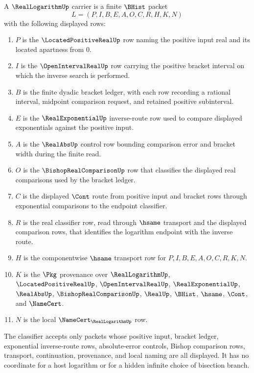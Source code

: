 \begin{definition}
\label{def:real-logarithm-carrier}
A $\RealLogarithmUp$ carrier is a finite $\BHist$ packet
$$
L=(P,I,B,E,A,O,C,R,H,K,N)
$$
with the following displayed rows:
\begin{enumerate}
\item $P$ is the $\LocatedPositiveRealUp$ row naming the positive input real and its located apartness from $0$.
\item $I$ is the $\OpenIntervalRealUp$ row carrying the positive bracket interval on which the inverse search is performed.
\item $B$ is the finite dyadic bracket ledger, with each row recording a rational interval, midpoint comparison request, and retained positive subinterval.
\item $E$ is the $\RealExponentialUp$ inverse-route row used to compare displayed exponentials against the positive input.
\item $A$ is the $\RealAbsUp$ control row bounding comparison error and bracket width during the finite read.
\item $O$ is the $\BishopRealComparisonUp$ row that classifies the displayed real comparisons used by the bracket ledger.
\item $C$ is the displayed $\Cont$ route from positive input and bracket rows through exponential comparisons to the endpoint classifier.
\item $R$ is the real classifier row, read through $\hsame$ transport and the displayed comparison rows, that identifies the logarithm endpoint with the inverse route.
\item $H$ is the componentwise $\hsame$ transport row for $P,I,B,E,A,O,C,R,K,N$.
\item $K$ is the $\Pkg$ provenance over $\RealLogarithmUp$, $\LocatedPositiveRealUp$, $\OpenIntervalRealUp$, $\RealExponentialUp$, $\RealAbsUp$, $\BishopRealComparisonUp$, $\RealUp$, $\BHist$, $\hsame$, $\Cont$, and $\NameCert$.
\item $N$ is the local $\NameCert_{\RealLogarithmUp}$ row.
\end{enumerate}
The classifier accepts only packets whose positive input, bracket ledger, exponential inverse-route rows, absolute-error controls, Bishop comparison rows, transport, continuation, provenance, and local naming are all displayed. It has no coordinate for a host logarithm or for a hidden infinite choice of bisection branch.
\end{definition}

